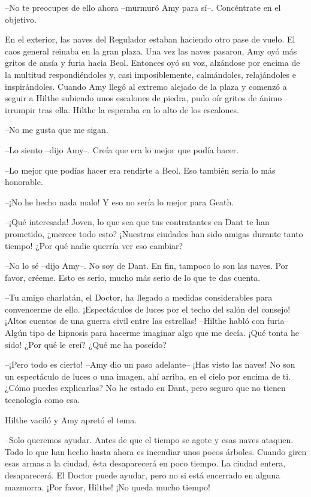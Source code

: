 {--No te preocupes de ello ahora --murmuró Amy para sí--. Concéntrate
en el objetivo.}

{En el exterior, las naves del Regulador estaban haciendo otro pase de
	vuelo. El caos general reinaba en la gran plaza. Una vez las naves
	pasaron, Amy oyó más gritos de ansía y furia hacia Beol. Entonces oyó su
	voz, alzándose por encima de la multitud respondiéndoles y, casi
	imposiblemente, calmándoles, relajándoles e inspirándoles. Cuando Amy
	llegó al extremo alejado de la plaza y comenzó a seguir a Hilthe
	subiendo unos escalones de piedra, pudo oír gritos de ánimo irrumpir
tras ella. Hilthe la esperaba en lo alto de los escalones.}

{--No me gusta que me sigan.}

{--Lo siento --dijo Amy--. Creía que era lo mejor que podía hacer.}

{--Lo mejor que podías hacer era rendirte a Beol. Eso también sería lo
más honorable.}

{--¡No he hecho nada malo! Y eso no sería lo mejor para Geath.}

{--¡Qué interesada! Joven, lo que sea que tus contratantes en Dant te
	han prometido, ¿merece todo esto? ¡Nuestras ciudades han sido amigas
durante tanto tiempo! ¿Por qué nadie querría ver eso cambiar?}

{--No lo sé --dijo Amy--. No soy de Dant. En fin, tampoco lo son las
	naves. Por favor, créeme. Esto es serio, mucho más serio de lo que te
das cuenta.}

{--Tu amigo charlatán, el Doctor, ha llegado a medidas considerables
	para convencerme de ello. ¡Espectáculos de luces por el techo del salón
	del consejo! ¡Altos cuentos de una guerra civil entre las estrellas!
	--Hilthe habló con furia-- Algún tipo de hipnosis para hacerme imaginar
	algo que me decía. ¡Qué tonta he sido! ¿Por qué le creí? ¿Qué me ha
poseído?}

{--¡Pero todo es cierto! --Amy dio un paso adelante-- ¡Has visto las
	naves! No son un espectáculo de luces o una imagen, ahí arriba, en el
	cielo por encima de ti. ¿Cómo puedes explicarlas? No he estado en Dant,
pero seguro que no tienen tecnología como esa.}

{Hilthe vaciló y Amy apretó el tema.}

{--Solo queremos ayudar. Antes de que el tiempo se agote y esas naves
	ataquen. Todo lo que han hecho hasta ahora es incendiar unos pocos
	árboles. Cuando giren esas armas a la ciudad, ésta desaparecerá en poco
	tiempo. La ciudad entera, desaparecerá. El Doctor puede ayudar, pero no
	si está encerrado en alguna mazmorra. ¡Por favor, Hilthe! ¡No queda
mucho tiempo!}

